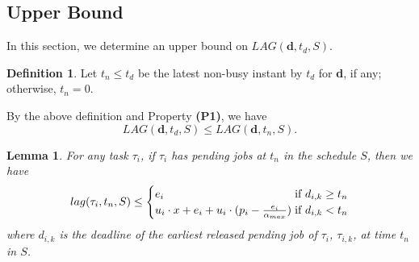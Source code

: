 \documentclass[Times, 10pt,twocolumn]{article}
\newtheorem{lemma}{\textbf{Lemma}}
\theoremstyle{definition}
\newtheorem{definition}{\textbf{Definition}}
\begin{document}
\subsection{Upper Bound}
\label{sec:upper_bound}

In this section, we determine an upper bound on $LAG(\textbf{d}, t_d, {S})$.

\begin{definition}
Let $t_n \leq t_d$ be the latest non-busy instant by $t_d$ for \textbf{d}, if any; otherwise, $t_n = 0$.
\end{definition}

By the above definition and Property \textbf{(P1)}, we have 
\begin{equation}
\label{eq:LAGincrease}
LAG(\textbf{d}, t_d, {S}) \leq LAG(\textbf{d}, t_n, {S}).
\end{equation}

\begin{lemma}
\label{lemma:Upper_lemma1}
For any task $\tau_i$, if $\tau_i$ has pending jobs at $t_{n}$ in the schedule ${S}$, then we have
\small
\[
 lag(\tau_i, t_n, {S}) \leq
  \begin{cases}
  e_i  &  \hspace{0mm} \hspace{-2.5mm} \text{if } d_{i,k} \geq t_n \\
   u_i \cdot x + e_i+u_i \cdot (p_i- \frac{e_i}{\alpha_{max}})   & \hspace{0mm} \hspace{-2.5mm} \text{if } d_{i,k} < t_{n}
  \end{cases}
\] \normalsize
where $d_{i,k}$ is the deadline of the earliest released pending job of $\tau_i$, $\tau_{i,k}$, at time $t_{n}$ in ${S}$. 
\end{lemma}
\end{document}
